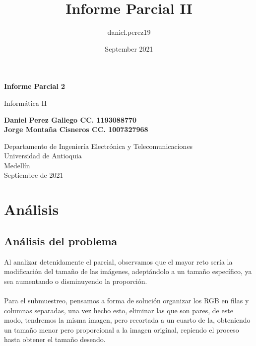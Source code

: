 \documentclass{article}
\title{Informe Parcial II}
\author{daniel.perez19 }
\date{September 2021}
\begin{document}
\begin{titlepage}
    \begin{center}
        \vspace*{1cm}
            
        \Huge
        \textbf{Informe Parcial 2}
            
        \vspace{0.5cm}
        \LARGE
        Informática II
            
        \vspace{1.5cm}
            
        \textbf{Daniel Perez Gallego CC. 1193088770\\Jorge Montaña Cisneros CC.  1007327968}
            
        \vfill
            
        \vspace{0.8cm}
            
        \Large
        Departamento de Ingeniería Electrónica y Telecomunicaciones\\
        Universidad de Antioquia\\
        Medellín\\
        Septiembre de 2021
            
    \end{center}
\end{titlepage}

\tableofcontents

\section{Análisis}
\subsection{Análisis del problema}
Al analizar detenidamente el parcial, observamos que el mayor reto  sería la modificación del tamaño de las imágenes, adeptándolo a un tamaño específico, ya sea aumentando o disminuyendo la proporción.\\ 
\\Para el submuestreo, pensamos a forma de solución organizar los RGB en filas y columnas separadas, una vez hecho esto, eliminar las que son pares, de este modo, tendremos la misma imagen, pero recortada a un cuarto de la,  obteniendo un tamaño menor pero proporcional a la imagen original, repiendo el proceso hasta obtener el tamaño deseado.\\
\end{document}
